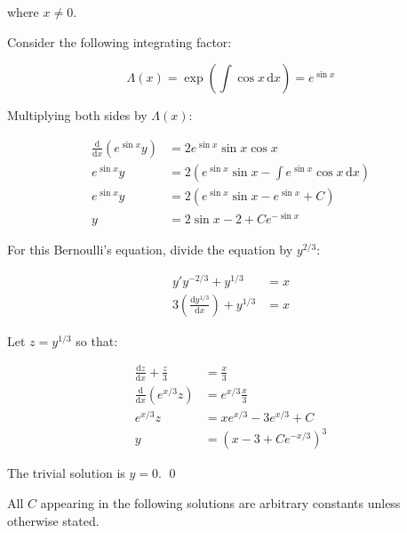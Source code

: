 \documentclass[12pt]{article}
\begin{document}
where $x \ne 0$.

Consider the following integrating factor:

\begin{equation}
    \Lambda(x) = \exp(\int \cos{x} \, \mathrm{d}x) = e^{\sin{x}}
\end{equation}

Multiplying both sides by $\Lambda(x)$:

\begin{equation}
    \begin{split}
        \frac{\mathrm{d}}{\mathrm{d}x} \left( e^{\sin{x}} y \right) &= 2e^{\sin{x}} \sin{x} \cos{x} \\
        e^{\sin{x}} y &= 2 \left( e^{\sin{x}} \sin{x} - \int e^{\sin{x}} \cos{x} \, \mathrm{d}x \right) \\
        e^{\sin{x}} y &= 2 \left( e^{\sin{x}} \sin{x} - e^{\sin{x}} + C \right) \\
        y &= 2\sin{x} - 2 + Ce^{-\sin{x}}
    \end{split}
\end{equation}

For this Bernoulli's equation, divide the equation by $y^{2/3}$:

\begin{equation}
    \begin{split}
        y' y^{-2/3} + y^{1/3} &= x \\
        3 \left( \frac{\mathrm{d}y^{1/3}}{\mathrm{d}x} \right) + y^{1/3} &= x
    \end{split}
\end{equation}

Let $z = y^{1/3}$ so that:

\begin{equation}
    \begin{split}
        \frac{\mathrm{d}z}{\mathrm{d}x} + \frac{z}{3} &= \frac{x}{3} \\
        \frac{\mathrm{d}}{\mathrm{d}x} \left( e^{x/3} z \right) &= e^{x/3} \frac{x}{3} \\
        e^{x/3} z &= x e^{x/3} - 3e^{x/3} + C \\
        y &= \left( x - 3 + Ce^{-x/3} \right)^{3}
    \end{split}
\end{equation}

The trivial solution is $y = 0$.
\qed


All $C$ appearing in the following solutions are arbitrary constants unless otherwise stated.
\end{document}

